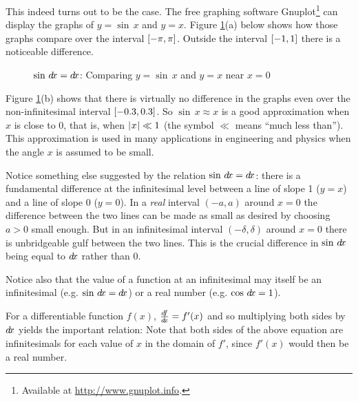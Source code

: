 This indeed turns out to be the case. The free graphing software
Gnuplot\footnote{Available at \url{http://www.gnuplot.info}.} can display the
graphs of $y=\sin\,x$ and $y=x$. Figure \ref{fig:sindx}(a) below shows how those
graphs compare over the interval $\lbrack -\pi,\pi \rbrack$. Outside the interval
$\lbrack -1,1 \rbrack$ there is a noticeable difference.\vspace{-3mm}

\begin{figure}[ht]
 \centering
 \subfloat[][]{}
 \subfloat[][]{}
 \caption[]{\quad $\sin\,d\!x = d\!x$: Comparing $y=\sin\,x$ and $y=x$ near $x=0$}
 \label{fig:sindx}
\end{figure}

Figure \ref{fig:sindx}(b) shows that there is virtually no difference in the
graphs even over the non-infinitesimal interval
$\lbrack -0.3,0.3 \rbrack$. So $\sin\,x \approx x$ is a good approximation
when $x$ is close to 0, that is, when $\lvert\mspace{1mu}x\mspace{1mu}\rvert \ll 1$ (the symbol $\ll$ means
``much less than'').\index{$\ll$} This approximation is used in many applications
in engineering and physics when the angle $x$ is assumed to be small.

Notice something else suggested by the relation $\sin\,d\!x = d\!x$: there is
a fundamental difference at the infinitesimal level between a line of slope 1
($y=x$) and a line of slope 0 ($y=0$). In a \emph{real} interval $(-a,a)$ around
$x=0$ the difference between the two lines can be made as small as desired by
choosing $a>0$ small enough. But in an infinitesimal interval $(-\delta,\delta)$
around $x=0$ there is unbridgeable gulf between the two lines. This is the
crucial difference in $\sin\,d\!x$ being equal to $d\!x$ rather than 0.

Notice also that the value of a function at an infinitesimal may itself be an
infinitesimal (e.g. $\sin\,d\!x = d\!x$) or a real number (e.g. $\cos\,d\!x = 1$).

For a differentiable function $f(x)$, $\frac{d\negmedspace f}{d\!x} = f'(x)$ and so multiplying both
sides by $d\!x$ yields the important relation:
Note that both sides of the above equation are infinitesimals for each value of
$x$ in the domain of $f'$, since $f'(x)$ would then be a real number.

